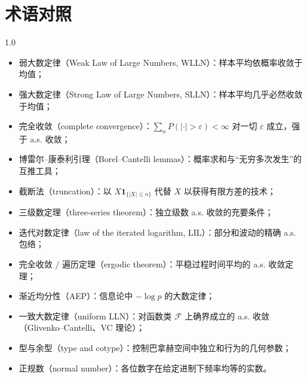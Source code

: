 \section*{术语对照}
\begin{spacing}{1.0}
\begin{itemize}[itemsep=0pt,topsep=4pt]
    \item 弱大数定律（Weak Law of Large Numbers, WLLN）：样本平均依概率收敛于均值；
    \item 强大数定律（Strong Law of Large Numbers, SLLN）：样本平均几乎必然收敛于均值；
    \item 完全收敛（complete convergence）：$\sum_n P(|\cdot| > \varepsilon) < \infty$ 对一切 $\varepsilon$ 成立，强于 a.s. 收敛；
    \item 博雷尔--康泰利引理（Borel--Cantelli lemmas）：概率求和与“无穷多次发生”的互推工具；
    \item 截断法（truncation）：以 $X\mathbf{1}_{\{|X|\leq n\}}$ 代替 $X$ 以获得有限方差的技术；
    \item 三级数定理（three-series theorem）：独立级数 a.s. 收敛的充要条件；
    \item 迭代对数定律（law of the iterated logarithm, LIL）：部分和波动的精确 a.s. 包络；
    \item 完全收敛 / 遍历定理（ergodic theorem）：平稳过程时间平均的 a.s. 收敛定理；
    \item 渐近均分性（AEP）：信息论中 $-\log p$ 的大数定律；
    \item 一致大数定律（uniform LLN）：对函数类 $\mathcal{F}$ 上确界成立的 a.s. 收敛（Glivenko--Cantelli、VC 理论）；
    \item 型与余型（type and cotype）：控制巴拿赫空间中独立和行为的几何参数；
    \item 正规数（normal number）：各位数字在给定进制下频率均等的实数。
\end{itemize}
\end{spacing}
